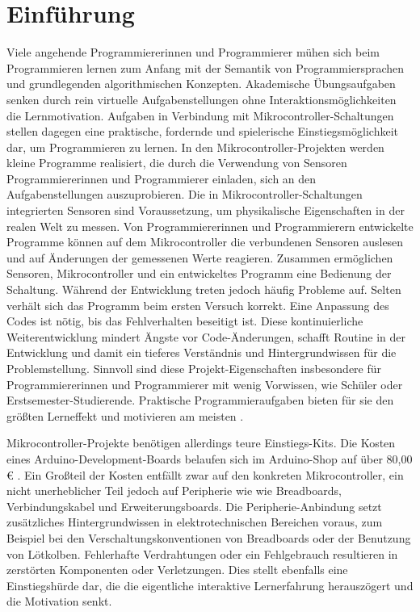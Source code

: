 \documentclass[11pt,a4paper]{report}
\begin{document}
\chapter{Einführung} \label{chap:intro}
Viele angehende Programmiererinnen und Programmierer mühen sich beim Programmieren lernen zum Anfang mit der Semantik von Programmiersprachen und grundlegenden algorithmischen Konzepten.
Akademische Übungsaufgaben senken durch rein virtuelle Aufgabenstellungen ohne Interaktionsmöglichkeiten die Lernmotivation.
Aufgaben in Verbindung mit Mikrocontroller-Schaltungen stellen dagegen eine praktische, fordernde und spielerische Einstiegsmöglichkeit dar, um Programmieren zu lernen.
In den Mikrocontroller-Projekten werden kleine Programme realisiert, die durch die Verwendung von Sensoren Programmiererinnen und Programmierer einladen, sich an den Aufgabenstellungen auszuprobieren.
Die in Mikrocontroller-Schaltungen integrierten Sensoren sind Voraussetzung, um physikalische Eigenschaften in der realen Welt zu messen.
Von Programmiererinnen und Programmierern entwickelte Programme können auf dem Mikrocontroller die verbundenen Sensoren auslesen und auf Änderungen der gemessenen Werte reagieren.
Zusammen ermöglichen Sensoren, Mikrocontroller und ein entwickeltes Programm eine Bedienung der Schaltung.
Während der Entwicklung treten jedoch häufig Probleme auf.
Selten verhält sich das Programm beim ersten Versuch korrekt.
Eine Anpassung des Codes ist nötig, bis das Fehlverhalten beseitigt ist.
Diese kontinuierliche Weiterentwicklung mindert Ängste vor Code-Änderungen, schafft Routine in der Entwicklung und damit ein tieferes Verständnis und Hintergrundwissen für die Problemstellung.
Sinnvoll sind diese Projekt-Eigenschaften insbesondere für Programmiererinnen und Programmierer mit wenig Vorwissen, wie Schüler oder Erstsemester-Studierende.
Praktische Programmieraufgaben bieten für sie den größten Lerneffekt und motivieren am meisten \cite{learning_computer_programming}.

Mikrocontroller-Projekte benötigen allerdings teure Einstiegs-Kits.
Die Kosten eines Arduino-Development-Boards belaufen sich im Arduino-Shop auf über 80,00 € \cite{arduino_kit}.
Ein Großteil der Kosten entfällt zwar auf den konkreten Mikrocontroller, ein nicht unerheblicher Teil jedoch auf Peripherie wie wie Breadboards, Verbindungskabel und Erweiterungsboards.
Die Peripherie-Anbindung setzt zusätzliches Hintergrundwissen in elektrotechnischen Bereichen voraus, zum  Beispiel bei den Verschaltungskonventionen von Breadboards oder der Benutzung von Lötkolben.
Fehlerhafte Verdrahtungen oder ein Fehlgebrauch resultieren in zerstörten Komponenten oder Verletzungen.
Dies stellt ebenfalls eine Einstiegshürde dar, die die eigentliche interaktive Lernerfahrung herauszögert und die Motivation senkt.
\end{document}
